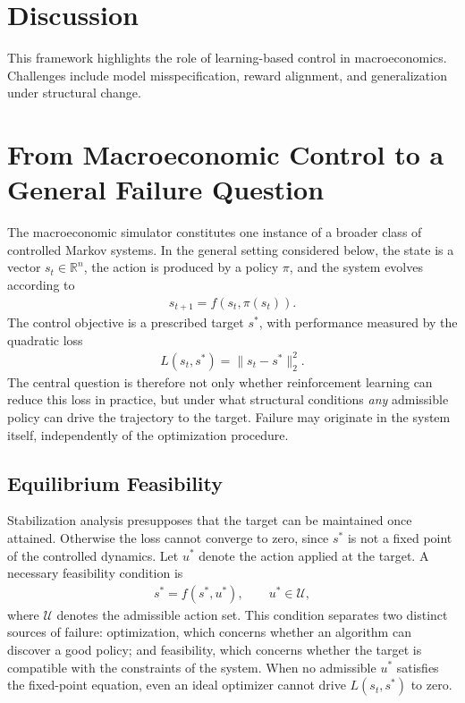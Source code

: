 \documentclass[11pt]{article}
\begin{document}
\section{Discussion}
This framework highlights the role of learning-based control in macroeconomics. Challenges include model misspecification, reward alignment, and generalization under structural change.

\section{From Macroeconomic Control to a General Failure Question}
The macroeconomic simulator constitutes one instance of a broader class of controlled Markov systems. In the general setting considered below, the state is a vector $s_t \in \mathbb{R}^n$, the action is produced by a policy $\pi$, and the system evolves according to
\begin{align*}
    s_{t+1} = f(s_t, \pi(s_t)).
\end{align*}
The control objective is a prescribed target $s^*$, with performance measured by the quadratic loss
\begin{align}
    L(s_t,s^*) = \|s_t - s^*\|_2^2.
\end{align}
The central question is therefore not only whether reinforcement learning can reduce this loss in practice, but under what structural conditions \emph{any} admissible policy can drive the trajectory to the target. Failure may originate in the system itself, independently of the optimization procedure.

\subsection{Equilibrium Feasibility}
Stabilization analysis presupposes that the target can be maintained once attained. Otherwise the loss cannot converge to zero, since $s^*$ is not a fixed point of the controlled dynamics. Let $u^*$ denote the action applied at the target. A necessary feasibility condition is
\begin{align*}
    s^* = f(s^*,u^*), \qquad u^* \in \mathcal{U},
\end{align*}
where $\mathcal{U}$ denotes the admissible action set. This condition separates two distinct sources of failure: optimization, which concerns whether an algorithm can discover a good policy; and feasibility, which concerns whether the target is compatible with the constraints of the system. When no admissible $u^*$ satisfies the fixed-point equation, even an ideal optimizer cannot drive $L(s_t,s^*)$ to zero.
\end{document}
